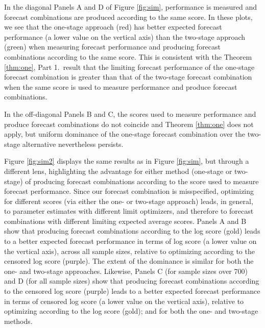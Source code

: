 \documentclass[12pt]{article}
\theoremstyle{definition}
\theoremstyle{remark}
\begin{document}
In the diagonal Panels A and D of Figure \ref{fig:sim}, performance is measured and forecast combinations are produced according to the same score. In these plots, we see that the one-stage approach (red) has better expected forecast performance (a lower value on the vertical axis) than the two-stage approach (green) when measuring forecast performance and producing forecast combinations according to the same score. This is consistent with the Theorem \ref{thm:one}, Part 1.\ result that the limiting forecast performance of the one-stage forecast combination is greater than that of the two-stage forecast combination when the same score is used to measure performance and produce forecast combinations.

In the off-diagonal Panels B and C, the scores used to measure performance and produce forecast combinations do not coincide and Theorem \ref{thm:one} does not apply, but uniform dominance of the one-stage forecast combination over the two-stage alternative nevertheless persists.

Figure \ref{fig:sim2} displays the same results as in Figure \ref{fig:sim}, but through a different lens, highlighting the advantage for either method (one-stage or two-stage) of producing forecast combinations according to the score used to measure forecast performance. Since our forecast combination is misspecified, optimizing for different scores (via either the one- or two-stage approach) leads, in general, to parameter estimates with different limit optimizers, and therefore to forecast combinations with different limiting expected average scores. Panels A and B show that producing forecast combinations according to the log score (gold) leads to a better expected forecast performance in terms of log score (a lower value on the vertical axis), across all sample sizes, relative to optimizing according to the censored log score (purple). The extent of the dominance is similar for both the one- and two-stage approaches. Likewise, Panels C (for sample sizes over 700) and D (for all sample sizes) show that producing forecast combinations according to the censored log score (purple) leads to a better expected forecast performance in terms of censored log score (a lower value on the vertical axis), relative to optimizing according to the log score (gold); and for both the one- and two-stage methods.
\end{document}
